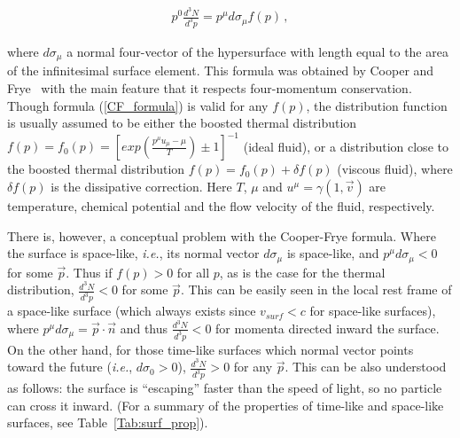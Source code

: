 \begin{eqnarray} \label{CF_formula}
  p^0 \frac{d^3N}{d^3p} = p^{\mu} d\sigma_{\mu} f(p) \,,
\end{eqnarray}

where $d\sigma_{\mu}$ a normal four-vector of the hypersurface with length equal to the
area of the infinitesimal surface element. This formula was obtained by Cooper and
Frye~\cite{Cooper:1974mv} with the main feature that it respects
four-momentum conservation. Though formula (\ref{CF_formula}) is valid
for any $f(p)$, the distribution function is usually assumed to be
either the boosted thermal distribution $f(p) = f_0(p) = \left[ exp
  \left(\frac{p^{\mu}u_{\mu} - \mu}{T} \right) \pm 1 \right]^{-1}$
(ideal fluid), or a distribution close to the boosted thermal
distribution $f(p) = f_0(p) + \delta f(p)$ (viscous fluid), where
$\delta f(p)$ is the dissipative correction. Here $T$, $\mu$ and
$u^\mu=\gamma(1,\vec{v})$ are temperature, chemical potential and the
flow velocity of the fluid, respectively.

There is, however, a conceptual problem with the Cooper-Frye
formula. Where the surface is space-like, \emph{i.e.}, its normal
vector $d\sigma_{\mu}$ is space-like, and $p^\mu d\sigma_\mu < 0$ for
some $\vec{p}$. Thus if $f(p)>0$ for all $p$, as is the case for the
thermal distribution, $\frac{d^3N}{d^3p} < 0$ for some $\vec{p}$. This
can be easily seen in the local rest frame of a space-like surface
(which always exists since $v_{surf} < c$ for space-like surfaces),
where $p^{\mu} d\sigma_{\mu} = \vec{p} \cdot \vec{n}$ and thus
$\frac{d^3N}{d^3p} < 0$ for momenta directed inward the surface. On
the other hand, for those time-like surfaces which normal vector
points toward the future (\emph{i.e.}, $d\sigma_0 > 0$),
$\frac{d^3N}{d^3p} > 0$ for any $\vec{p}$. This can be also understood
as follows: the surface is ``escaping'' faster than the speed of light, so
no particle can cross it inward. (For a summary of the properties of
time-like and space-like surfaces, see Table~\ref{Tab:surf_prop}).


